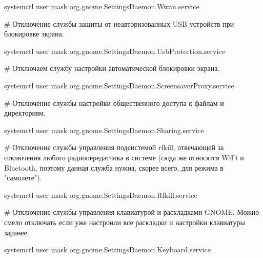 \documentclass[letterpaper,10pt,russian,openany]{sphinxmanual}
\begin{document}
\begin{sphinxVerbatim}[commandchars=\\\{\}]
systemctl \PYGZhy{}\PYGZhy{}user mask org.gnome.SettingsDaemon.Wwan.service
\end{sphinxVerbatim}

\sphinxAtStartPar
\# Отключение службы защиты от неавторизованных USB устройств при блокировке экрана.

\begin{sphinxVerbatim}[commandchars=\\\{\}]
systemctl \PYGZhy{}\PYGZhy{}user mask org.gnome.SettingsDaemon.UsbProtection.service
\end{sphinxVerbatim}

\sphinxAtStartPar
\# Отключаем службу настройки автоматической блокировки экрана.

\begin{sphinxVerbatim}[commandchars=\\\{\}]
systemctl \PYGZhy{}\PYGZhy{}user mask org.gnome.SettingsDaemon.ScreensaverProxy.service
\end{sphinxVerbatim}

\sphinxAtStartPar
\# Отключение службы настройки общественного доступа к файлам и директориям.

\begin{sphinxVerbatim}[commandchars=\\\{\}]
systemctl \PYGZhy{}\PYGZhy{}user mask org.gnome.SettingsDaemon.Sharing.service
\end{sphinxVerbatim}

\sphinxAtStartPar
\# Отключение службы управления подсистемой rfkill, отвечающей за отключения любого радиопередатчика в системе
(сюда же относятся Wi\sphinxhyphen{}Fi и Bluetooth, поэтому данная служба нужна, скорее всего, для режима в "самолете").

\begin{sphinxVerbatim}[commandchars=\\\{\}]
systemctl \PYGZhy{}\PYGZhy{}user mask org.gnome.SettingsDaemon.Rfkill.service
\end{sphinxVerbatim}

\sphinxAtStartPar
\# Отключение службы управления клавиатурой и раскладками GNOME.
Можно смело отключать если уже настроили все раскладки и настройки клавиатуры заранее.

\begin{sphinxVerbatim}[commandchars=\\\{\}]
systemctl \PYGZhy{}\PYGZhy{}user mask org.gnome.SettingsDaemon.Keyboard.service
\end{sphinxVerbatim}
\end{document}
